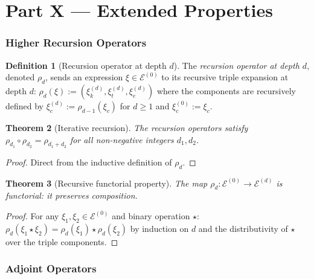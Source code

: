\documentclass[twocolumn,11pt,a4paper]{article}
\theoremstyle{thmstyle}
\newtheorem{theorem}{Theorem}[section]
\theoremstyle{thmstyle}
\theoremstyle{definition}
\newtheorem{definition}[theorem]{Definition}
\theoremstyle{remark}
\newcommand{\Expr}{\mathcal{E}}
\begin{document}
\part*{Part X --- Extended Properties}

\section{Higher Recursion Operators}
\label{sec:higher-recursion}

\begin{definition}[Recursion operator at depth $d$]
\label{def:rec-op-d}
The \emph{recursion operator at depth $d$},
denoted $\rho_{d}$, sends an expression
$\xi \in \Expr^{(0)}$ to its recursive triple
expansion at depth $d$:
$\rho_{d}(\xi) := (\xi_{k}^{(d)},
\xi_{t}^{(d)}, \xi_{e}^{(d)})$ where the
components are recursively defined by
$\xi_{c}^{(d)} := \rho_{d-1}(\xi_{c})$ for $d \geq
1$ and $\xi_{c}^{(0)} := \xi_{c}$.
\end{definition}

\begin{theorem}[Iterative recursion]
\label{thm:iter-rec}
The recursion operators satisfy
$\rho_{d_{1}} \circ \rho_{d_{2}} = \rho_{d_{1} + d_{2}}$
for all non-negative integers $d_{1}, d_{2}$.
\end{theorem}

\begin{proof}
Direct from the inductive definition of
$\rho_{d}$.
\end{proof}

\begin{theorem}[Recursive functorial property]
\label{thm:rec-functorial}
The map $\rho_{d}: \Expr^{(0)} \to \Expr^{(d)}$ is
functorial: it preserves composition.
\end{theorem}

\begin{proof}
For any $\xi_{1}, \xi_{2} \in \Expr^{(0)}$ and
binary operation $\star$:
$\rho_{d}(\xi_{1} \star \xi_{2}) =
\rho_{d}(\xi_{1}) \star \rho_{d}(\xi_{2})$
by induction on $d$ and the distributivity of
$\star$ over the triple components.
\end{proof}

\section{Adjoint Operators}
\label{sec:adjoint-ops}
\end{document}
